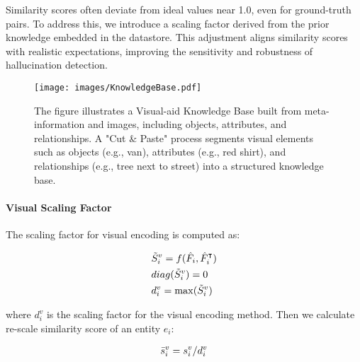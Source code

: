 
Similarity scores often deviate from ideal values near 1.0, even for ground-truth pairs. To address this, we introduce a scaling factor derived from the prior knowledge embedded in the datastore. This adjustment aligns similarity scores with realistic expectations, improving the sensitivity and robustness of hallucination detection.

\begin{figure}[t]

    \centering
    \texttt{[image: images/KnowledgeBase.pdf]}
    \caption{The figure illustrates a Visual-aid Knowledge Base built from meta-information and images, including objects, attributes, and relationships. A "Cut \& Paste" process segments visual elements such as objects (e.g., van), attributes (e.g., red shirt), and relationships (e.g., tree next to street) into a structured knowledge base. }
    \label{fig:kb}
    \vspace{-10pt}
\end{figure}

\paragraph{Visual Scaling Factor}
The scaling factor for visual encoding is computed as:

\vspace{-5pt}
\begin{align}
    &\tilde{S}^v_i = f(\hat{F}_i, \hat{F}_i^\intercal) \\
    &diag(\tilde{S}^v_i) = 0 \\
    &d^v_i = \max(\tilde{S}^v_i)
\vspace{-5pt}
\end{align}


\noindent where $d^v_i$ is the scaling factor for the visual encoding method. Then we calculate re-scale similarity score of an entity $e_i$:

\vspace{-5pt}
\begin{align}
    \bar{s}^{v}_i = s^{v}_i / d^v_i
\vspace{-5pt}
\end{align}

